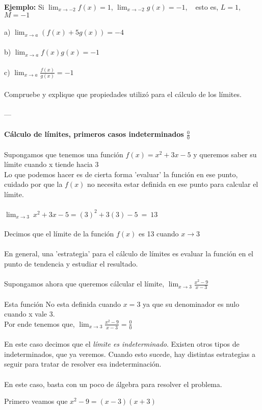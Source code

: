 \documentclass[11pt, a4paper]{article}
\begin{document}
{\begin{center}
\begin{tabular}{ | m | m | }
\end{tabular}
\end{center}
{\color{green} \textbf{Ejemplo:} Si $\displaystyle \lim_{ x\to -2} f(x) = 1 $, $\displaystyle \lim_{ x\to -2} g(x) = -1 $, ~ esto es, $L=1$, $M=-1$  } \\ \\
a) $\displaystyle \lim_{ x\to a} ( f(x) + 5g(x) ) = -4$ \\ \\
b) $\displaystyle \lim_{ x\to a}  f(x)g(x) = -1 $ \\ \\
c) $\displaystyle \lim_{ x\to a} \frac{f(x)}{g(x)} = -1 $\\ \\ 
{\color{magenta} Compruebe y explique que propiedades utiliz\'o para el c\'alculo de los l\'imites.} \\ \\
---\\ \\
\textbf{C\'alculo de l\'imites, primeros casos indeterminados $\frac{0}{0}$ }\\ \\
Supongamos que tenemos una funci\'on $f(x) = x^2 + 3x - 5$ y queremos saber su l\'imite cuando x tiende hacia 3\\ 
Lo que podemos hacer es de cierta forma {\color{magenta}'evaluar'} la funci\'on en ese punto, cuidado por que la $f(x)$ no necesita estar definida en ese punto para calcular el l\'imite. \\ \\
$ \displaystyle \lim_{x\to3} ~ x^2 + 3x - 5 = (3)^2 +3(3) - 5 ~=~ 13  $ \\ \\
Decimos que el l\'imite de la funci\'on $f(x)$ es 13 cuando $x \to 3$ \\ \\ 
En general, una 'estrategia' para el c\'alculo de l\'imites es evaluar la funci\'on en el punto de tendencia y estudiar el resultado. \\ \\ 
Supongamos ahora que queremos c\'alcular el l\'imite, { \color{blue} $\displaystyle \lim_{ x\to 3} \frac{x^2-9}{x-3} $} \\ \\
Esta funci\'on No esta definida cuando $ x=3 $ ya que su denominador es nulo cuando x vale 3.\\ 
Por ende tenemos que, {\color{blue} $\displaystyle \lim_{ x\to 3} \frac{x^2-9}{x-3} = \frac{0}{0}$ } \\ \\ 
En este caso decimos que el \textit{l\'imite es indeterminado}. Existen otros tipos de indeterminados, que ya veremos. Cuando esto sucede, hay distintas estrategias a seguir para tratar de resolver esa indeterminaci\'on. \\ \\
En este caso, basta con un poco de \'algebra para resolver el problema.\\ 
\begin{center}
    Primero veamos que {\color{blue} $x^2 - 9 = (x-3)(x+3)$} \\ \hfill
    

\end{center}}
\end{document}
